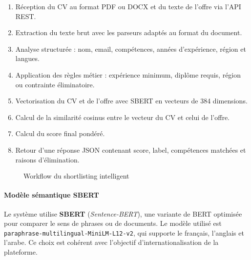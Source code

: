 \documentclass[12pt,a4paper]{report}
\begin{document}
\begin{enumerate}
  \item Réception du CV au format PDF ou DOCX et du texte de l'offre via l'API REST.
  \item Extraction du texte brut avec les parseurs adaptés au format du document.
  \item Analyse structurée : nom, email, compétences, années d'expérience, région et langues.
  \item Application des règles métier : expérience minimum, diplôme requis, région ou contrainte éliminatoire.
  \item Vectorisation du CV et de l'offre avec SBERT en vecteurs de 384 dimensions.
  \item Calcul de la similarité cosinus entre le vecteur du CV et celui de l'offre.
  \item Calcul du score final pondéré.
  \item Retour d'une réponse JSON contenant score, label, compétences matchées et raisons d'élimination.
\end{enumerate}

\begin{figure}[H]
\centering
{}
\caption{Workflow du shortlisting intelligent}
\label{fig:workflow-shortlisting}
\end{figure}

\paragraph{Modèle sémantique SBERT}

Le système utilise \textbf{SBERT} (\textit{Sentence-BERT}), une variante de BERT optimisée pour comparer le sens de phrases ou de documents. Le modèle utilisé est \texttt{paraphrase-multilingual-MiniLM-L12-v2}, qui supporte le français, l'anglais et l'arabe. Ce choix est cohérent avec l'objectif d'internationalisation de la plateforme.
\end{document}
